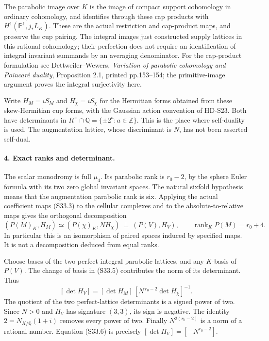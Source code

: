 The parabolic image over \(K\) is the image of compact support
cohomology in ordinary cohomology, and identifies through these
cap products with \(H^1(\mathbb P^1,j_*L_K)\). These are the
actual restriction and cap-product maps, and preserve the cup
pairing. The integral images just constructed supply lattices in
this rational cohomology; their perfection does not require an
identification of integral invariant summands by an averaging
denominator. For the cap-product formulation see
Dettweiler--Wewers, \emph{Variation of parabolic cohomology and
Poincar\'e duality}, Proposition 2.1, printed pp.153--154; the
primitive-image argument proves the integral surjectivity here.

Write \(H_M=iS_M\) and \(H_\chi=iS_\chi\) for the Hermitian
forms obtained from these skew-Hermitian cup forms, with the
Gaussian action convention of HD-S23. Both have determinants in
\(R^\times\cap\mathbb Q=\{\pm2^a:a\in\mathbb Z\}\).
This is the place where self-duality is used. The augmentation
lattice, whose discriminant is \(N\), has not been asserted
self-dual.

\paragraph{4. Exact ranks and determinant.}
The scalar monodromy is full \(\mu_4\). Its parabolic rank is
\(r_0-2\), by the sphere Euler formula with its two zero global
invariant spaces. The natural sixfold hypothesis means that the
augmentation parabolic rank is six. Applying the actual coefficient
maps (S33.3) to the cellular complexes and to the absolute-to-relative
maps gives the orthogonal decomposition
\[
 (P(M)_K,H_M)
   \simeq (P(\chi)_K,NH_\chi)\ \perp\ (P(V),H_V),
 \qquad \operatorname{rank}_K P(M)=r_0+4.
 \tag{S33.5}
\]
In particular this is an isomorphism of paired spaces induced by
specified maps. It is not a decomposition deduced from equal ranks.

Choose bases of the two perfect integral parabolic lattices, and
any \(K\)-basis of \(P(V)\). The change of basis in (S33.5)
contributes the norm of its determinant. Thus
\[
 [\det H_V]=
  [\det H_M]\,[N^{\,r_0-2}\det H_\chi]^{-1}.
 \tag{S33.6}
\]
The quotient of the two perfect-lattice determinants is a signed
power of two. Since \(N>0\) and \(H_V\) has signature
\((3,3)\), its sign is negative. The identity \(2=N_{K/\mathbb Q}(1+i)\)
removes every power of two. Finally \(N^{2(r_0-2)}\) is a norm
of a rational number. Equation (S33.6) is precisely
\([\det H_V]=[-N^{r_0-2}]\).

